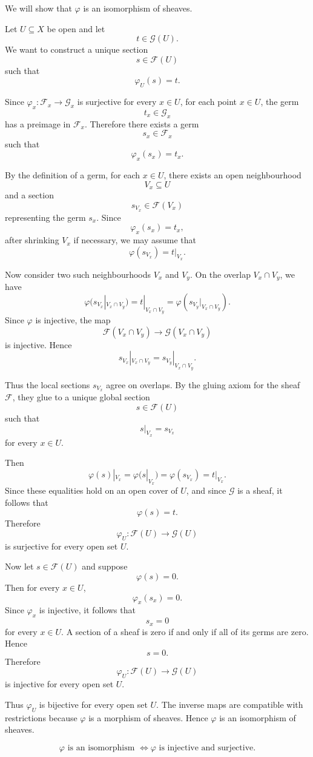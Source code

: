 \documentclass[12pt,a4paper]{article}
\newcommand{\F}{\mathcal F}
\newcommand{\G}{\mathcal G}
\theoremstyle{notespace}
\begin{document}
We will show that \(\varphi\) is an isomorphism of sheaves.

Let \(U\subseteq X\) be open and let
\[
t\in \G(U).
\]
We want to construct a unique section
\[
s\in \F(U)
\]
such that
\[
\varphi_U(s)=t.
\]

Since \(\varphi_x:\F_x\to \G_x\) is surjective for every \(x\in U\), for each point \(x\in U\), the germ
\[
t_x\in \G_x
\]
has a preimage in \(\F_x\). Therefore there exists a germ
\[
s_x\in \F_x
\]
such that
\[
\varphi_x(s_x)=t_x.
\]

By the definition of a germ, for each \(x\in U\), there exists an open neighbourhood
\[
V_x\subseteq U
\]
and a section
\[
s_{V_x}\in \F(V_x)
\]
representing the germ \(s_x\). Since
\[
\varphi_x(s_x)=t_x,
\]
after shrinking \(V_x\) if necessary, we may assume that
\[
\varphi(s_{V_x})=t|_{V_x}.
\]

Now consider two such neighbourhoods \(V_x\) and \(V_y\). On the overlap \(V_x\cap V_y\), we have
\[
\varphi(s_{V_x}|_{V_x\cap V_y})
=
t|_{V_x\cap V_y}
=
\varphi(s_{V_y}|_{V_x\cap V_y}).
\]
Since \(\varphi\) is injective, the map
\[
\F(V_x\cap V_y)\longrightarrow \G(V_x\cap V_y)
\]
is injective. Hence
\[
s_{V_x}|_{V_x\cap V_y}
=
s_{V_y}|_{V_x\cap V_y}.
\]

Thus the local sections \(s_{V_x}\) agree on overlaps. By the gluing axiom for the sheaf \(\F\), they glue to a unique global section
\[
s\in \F(U)
\]
such that
\[
s|_{V_x}=s_{V_x}
\]
for every \(x\in U\).

Then
\[
\varphi(s)|_{V_x}
=
\varphi(s|_{V_x})
=
\varphi(s_{V_x})
=
t|_{V_x}.
\]
Since these equalities hold on an open cover of \(U\), and since \(\G\) is a sheaf, it follows that
\[
\varphi(s)=t.
\]
Therefore
\[
\varphi_U:\F(U)\longrightarrow \G(U)
\]
is surjective for every open set \(U\).

Now let \(s\in \F(U)\) and suppose
\[
\varphi(s)=0.
\]
Then for every \(x\in U\),
\[
\varphi_x(s_x)=0.
\]
Since \(\varphi_x\) is injective, it follows that
\[
s_x=0
\]
for every \(x\in U\). A section of a sheaf is zero if and only if all of its germs are zero. Hence
\[
s=0.
\]
Therefore
\[
\varphi_U:\F(U)\longrightarrow \G(U)
\]
is injective for every open set \(U\).

Thus \(\varphi_U\) is bijective for every open set \(U\). The inverse maps are compatible with restrictions because \(\varphi\) is a morphism of sheaves. Hence \(\varphi\) is an isomorphism of sheaves.

\[
\boxed{
	\varphi \text{ is an isomorphism }
	\Longleftrightarrow
	\varphi \text{ is injective and surjective.}
}
\]
\end{document}

